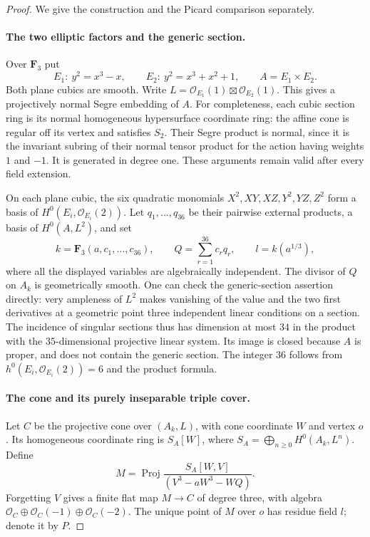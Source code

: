 \begin{proof}
We give the construction and the Picard comparison separately.

\paragraph{The two elliptic factors and the generic section.}
Over $\mathbf F_3$ put
\[
 E_1:\ y^2=x^3-x,\qquad
 E_2:\ y^2=x^3+x^2+1,
 \qquad A=E_1\times E_2.
\]
Both plane cubics are smooth.  Write
$L=\mathcal O_{E_1}(1)\boxtimes\mathcal O_{E_2}(1)$.
This gives a projectively normal Segre embedding of $A$.
For completeness, each cubic section ring is its normal
homogeneous hypersurface coordinate ring: the affine cone is
regular off its vertex and satisfies $S_2$.  Their Segre product
is normal, since it is the invariant subring of their normal
tensor product for the action having weights $1$ and $-1$.
It is generated in degree one.  These arguments remain valid
after every field extension.

On each plane cubic, the six quadratic monomials
$X^2,XY,XZ,Y^2,YZ,Z^2$ form a basis of
$H^0(E_i,\mathcal O_{E_i}(2))$.  Let
$q_1,\ldots,q_{36}$ be their pairwise external products,
a basis of $H^0(A,L^2)$, and set
\[
 k=\mathbf F_3(a,c_1,\ldots,c_{36}),\qquad
 Q=\sum_{r=1}^{36}c_rq_r,
 \qquad l=k(a^{1/3}),
\]
where all the displayed variables are algebraically independent.
The divisor of $Q$ on $A_k$ is geometrically smooth.  One can
check the generic-section assertion directly: very ampleness of
$L^2$ makes vanishing of the value and the two first derivatives
at a geometric point three independent linear conditions on a
section.  The incidence of singular sections thus has dimension
at most $34$ in the product with the $35$-dimensional projective
linear system.  Its image is closed because $A$ is proper, and
does not contain the generic section.  The integer $36$ follows
from $h^0(E_i,\mathcal O_{E_i}(2))=6$ and the product formula.

\paragraph{The cone and its purely inseparable triple cover.}
Let $C$ be the projective cone over $(A_k,L)$, with cone coordinate
$W$ and vertex $o$.  Its homogeneous coordinate ring is
$S_A[W]$, where $S_A=\bigoplus_{n\ge0}H^0(A_k,L^n)$.
Define
\[
 M=\operatorname{Proj}
 \frac{S_A[W,V]}{(V^3-aW^3-WQ)}.
 \tag{B.2.7}
\]
Forgetting $V$ gives a finite flat map $M\to C$ of degree three,
with algebra
$\mathcal O_C\oplus\mathcal O_C(-1)\oplus\mathcal O_C(-2)$.
The unique point of $M$ over $o$ has residue field $l$; denote it
by $P$.


\end{proof}

